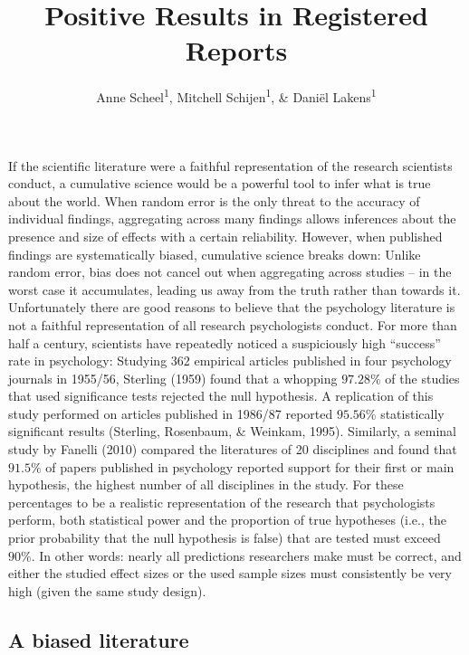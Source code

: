 \documentclass[british,,man,floatsintext]{apa6}
\author{Anne Scheel\textsuperscript{1}, Mitchell Schijen\textsuperscript{1}, \& Daniël Lakens\textsuperscript{1}}
\affiliation{
\vspace{0.5cm}
\textsuperscript{1} Eindhoven University of Technology}
\title{Positive Results in Registered Reports}
\date{}
\begin{document}
\maketitle

If the scientific literature were a faithful representation of the research scientists conduct, a cumulative science would be a powerful tool to infer what is true about the world.
When random error is the only threat to the accuracy of individual findings, aggregating across many findings allows inferences about the presence and size of effects with a certain reliability.
However, when published findings are systematically biased, cumulative science breaks down:
Unlike random error, bias does not cancel out when aggregating across studies -- in the worst case it accumulates, leading us away from the truth rather than towards it.
Unfortunately there are good reasons to believe that the psychology literature is not a faithful representation of all research psychologists conduct.
For more than half a century, scientists have repeatedly noticed a suspiciously high \enquote{success} rate in psychology:
Studying 362 empirical articles published in four psychology journals in 1955/56, Sterling (1959) found that a whopping \(97.28\%\) of the studies that used significance tests rejected the null hypothesis.
A replication of this study performed on articles published in 1986/87 reported \(95.56\%\) statistically significant results (Sterling, Rosenbaum, \& Weinkam, 1995).
Similarly, a seminal study by Fanelli (2010) compared the literatures of 20 disciplines and found that \(91.5\%\) of papers published in psychology reported support for their first or main hypothesis, the highest number of all disciplines in the study.
For these percentages to be a realistic representation of the research that psychologists perform, both statistical power and the proportion of true hypotheses (i.e., the prior probability that the null hypothesis is false) that are tested must exceed \(90\%\).
In other words: nearly all predictions researchers make must be correct, and either the studied effect sizes or the used sample sizes must consistently be very high (given the same study design).

\hypertarget{a-biased-literature}{%
\subsection{A biased literature}\label{a-biased-literature}}
\end{document}
